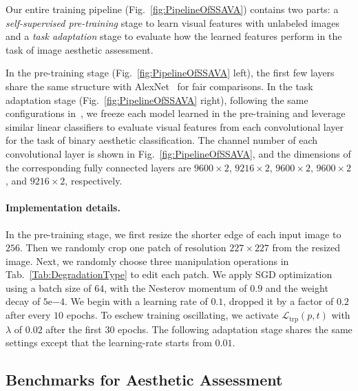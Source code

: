 \documentclass[letterpaper]{article}
\newcommand{\commentout}[1]{} %
\newcommand{\patch}{p}
\newcommand{\transformation}{t}
\newcommand{\loss}{\mathcal{L}}
\newcommand{\tripletloss}{\loss_{\mathrm{trp}}}
\begin{document}
Our entire training pipeline (Fig.~\ref{fig:PipelineOfSSAVA}) contains two parts: a {\em self-supervised pre-training} stage to learn visual features with unlabeled images and a {\em task adaptation} stage to evaluate how the learned features perform in the task of image aesthetic assessment.

In the pre-training stage (Fig.~\ref{fig:PipelineOfSSAVA} left), the first few layers share the same structure with AlexNet~\cite{krizhevsky2012imagenet} for fair comparisons.
In the task adaptation stage (Fig.~\ref{fig:PipelineOfSSAVA} right), following the same configurations in~\cite{zhang2017split}, we freeze each model learned in the pre-training and leverage similar linear classifiers
\commentout{ (see Tab.~\ref{Tab:LinearClassifierConfiguration})} to evaluate visual features from each convolutional layer for the task of binary aesthetic classification.
The channel number of each convolutional layer is shown in Fig.~\ref{fig:PipelineOfSSAVA}, and the dimensions of the corresponding fully connected layers are $9600 \times 2$, $9216\times 2$, $9600\times 2$, $9600\times 2$, and $9216\times 2$, respectively.

\paragraph{Implementation details.}
In the pre-training stage, we first resize the shorter edge of each input image to $256$.
Then we randomly crop one patch of resolution $227 \times 227$ from the resized image.
Next, we randomly choose three manipulation operations\commentout{ due to the limited GPU memory} in Tab.~\ref{Tab:DegradationType} to edit each patch.
We apply SGD optimization using a batch size of $64$, with the Nesterov momentum of $0.9$ and the weight decay of $5\mathrm{e}{-4}$.
We begin with a learning rate of $0.1$, dropped it by a factor of $0.2$ after every $10$ epochs.
To eschew training oscillating, we activate $\tripletloss(\patch, \transformation)$ with $\lambda$ of $0.02$ after the first $30$ epochs.
The following adaptation stage shares the same settings except that the learning-rate starts from $0.01$.


\subsection{Benchmarks for Aesthetic Assessment}
\label{sec:benchmarks}
\end{document}
